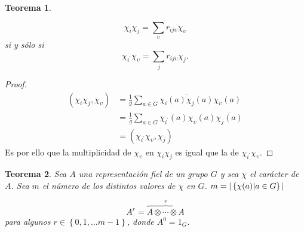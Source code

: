 \documentclass[12pt]{book}
\newtheorem{theorem}{Teorema}[section]
\theoremstyle{definition}
\newcounter{in}
\begin{document}
\begin{theorem}
  \label{t6_2}
  
\begin{equation*}
  \chi_{i} \chi_{j} = \sum_{\upsilon} r_{ij \upsilon} \chi_{\upsilon}
\end{equation*}
si y sólo si
\begin{equation*}
  \chi_{i^{'}}\chi_{\upsilon} =  \sum_{j} r_{ij \upsilon} \chi_{j}.
\end{equation*}
\end{theorem}
\begin{proof}
  \begin{equation}
    \label{eq:5}
    \begin{aligned}
      (\chi_{i} \chi_{j}, \chi_{\upsilon}) &= \frac{1}{g} \sum_{a \in G} \overline{\chi_{i}(a) \chi_{j}(a)} \chi_{\upsilon}(a) \\
      & = \frac{1}{g} \sum_{a \in G} \chi_{i^{'}}(a) \chi_{\upsilon}(a) \overline{\chi_{j}(a)} \\
      & = (\chi_{i^{'}} \chi_{\upsilon},\chi_{j})
    \end{aligned}
  \end{equation}
  Es por ello que la multiplicidad de $\chi_{\upsilon}$ en
  $\chi_{i} \chi_{j}$ es igual que la de
  $\chi_{i^{'}} \chi_{\upsilon}$.  
\end{proof}
\begin{theorem}
  \label{t6_3}
  Sea $A$ una representación fiel de un grupo $G$ y
  sea $\chi$ el carácter de $A$. Sea $m$ el número de los distintos
  valores de $\chi$ en $G$.
  $m = \arrowvert \left\{ \chi(a) \arrowvert a \in G \right\}
  \arrowvert$

  \begin{equation*}
    A^{r}=  \overbrace{A \otimes \cdots \otimes A}^{r}
  \end{equation*}
  para algunos $r \in \left\{ 0, 1, \ldots m-1 \right\}$, donde $A^{0}=1_{G}$.
\end{theorem}
\backmatter




\printindex
\end{document}
